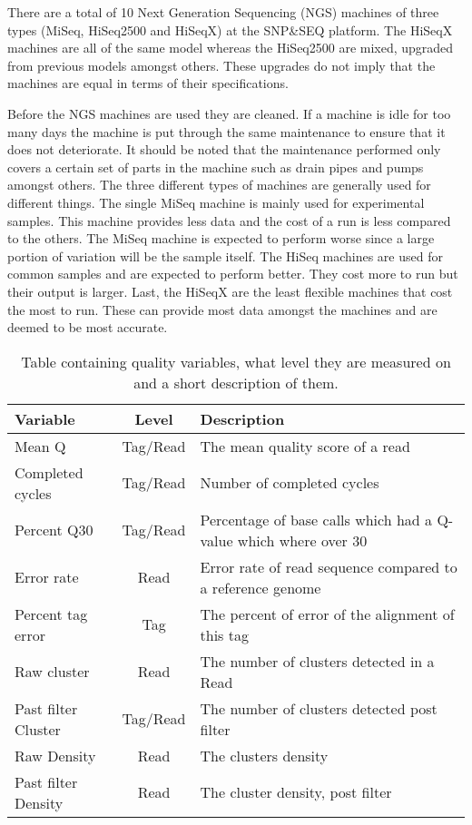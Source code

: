 There are a total of 10 Next Generation Sequencing (NGS) machines of three types (MiSeq, HiSeq2500  and HiSeqX) at the SNP\&SEQ platform. The HiSeqX machines are all of the same model whereas the HiSeq2500 are mixed, upgraded from previous models amongst others. These upgrades do not imply that the machines are equal in terms of their specifications.

Before the NGS machines are used they are cleaned. If a machine is idle for too many days the machine is put through the same maintenance to ensure that it does not deteriorate. It should be noted that the maintenance performed only covers a certain set of parts in the machine such as drain pipes and pumps amongst others. The three different types of machines are generally used for different things. The single MiSeq machine is mainly used for experimental samples. This machine provides less data and the cost of a run is less compared to the others. The MiSeq machine is expected to perform worse since a large portion of variation will be the sample itself. The HiSeq machines are used for common samples and are expected to perform better. They cost more to run but their output is larger. Last, the HiSeqX are the least flexible machines that cost the most to run. These can provide most data amongst the machines and are deemed to be most accurate. 
\begin{table}[!ht]
\centering
\caption{Table containing quality variables, what level they are measured on and a short description of them. \label{VariableTable}}
\begin{tabular}{lc p{7cm}}
\toprule
Variable & Level & Description \\
\midrule
Mean Q & Tag/Read & The mean quality score of a read \\ 
\midrule
Completed cycles & Tag/Read & Number of completed cycles\\
\midrule
Percent Q30 & Tag/Read & Percentage of base calls which had a Q-value which where over 30 \\ 
\midrule
Error rate & Read & Error rate of read sequence compared to a reference genome  \\ 
\midrule
Percent tag error & Tag & The percent of error of the alignment of this tag \\
\midrule 
Raw cluster & Read & The number of clusters detected in a Read \\ 
\midrule
Past filter Cluster & Tag/Read & The number of clusters detected post filter \\ 
\midrule
Raw Density & Read & The clusters density \\ 
\midrule
Past filter Density & Read & The cluster density, post filter \\
\bottomrule
\end{tabular}
\end{table}

